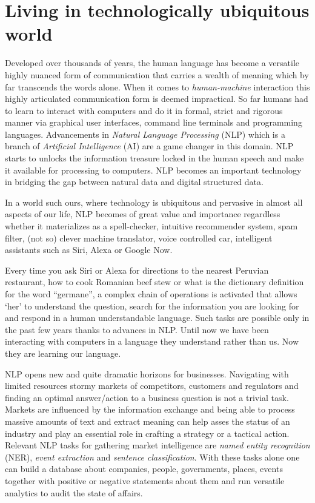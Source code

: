 
\section{Living in technologically ubiquitous world}
\label{sec:motivation}
Developed over thousands of years, the human language has become a versatile highly nuanced form of communication that carries a wealth of meaning which by far transcends the words alone. When it comes to \textit{human-machine} interaction this highly articulated communication form is deemed impractical. So far humans had to learn to interact with computers and do it in  formal, strict and rigorous manner via graphical user interfaces, command line terminals and programming languages. Advancements in \textit{Natural Language Processing} (NLP) which is a branch of \textit{Artificial Intelligence} (AI) are a game changer in this domain. NLP starts to unlocks the information treasure locked in the human speech and make it available for processing to computers. NLP becomes an important technology in bridging the gap between natural data and digital structured data.

In a world such ours, where technology is ubiquitous and pervasive in almost all aspects of our life, NLP becomes of great value and importance regardless whether it materializes as a spell-checker, intuitive recommender system, spam filter, (not so) clever machine translator, voice controlled car, intelligent assistants such as Siri, Alexa or Google Now. 

Every time you ask Siri or Alexa for directions to the nearest Peruvian restaurant, how to cook Romanian beef stew or what is the dictionary definition for the word ``germane'', a complex chain of operations is activated that allows `her' to understand the question, search for the information you are looking for and respond in a human understandable language. Such tasks are possible only in the past few years thanks to advances in NLP. Until now we have been interacting with computers in a language they understand rather than us. Now they are learning our language. 


NLP opens new and quite dramatic horizons for businesses. Navigating with limited resources stormy markets of competitors, customers and regulators and finding an optimal answer/action to a business question is not a trivial task. 
Markets are influenced by the information exchange and being able to process massive amounts of text and extract meaning can help asses the status of an industry and play an essential role in crafting a strategy or a tactical action. 
Relevant NLP tasks for gathering market intelligence are \textit{named entity recognition} (NER), \textit{event extraction} and \textit{sentence classification}. With these tasks alone one can build a database about companies, people, governments, places, events together with positive or negative statements about them and run versatile analytics to audit the state of affairs.

